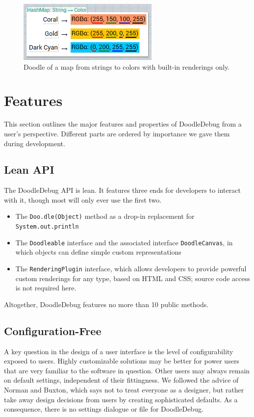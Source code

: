 \documentclass[english]{scrartcl}
\newcommand{\DD}{Dood\-le\-De\-bug\xspace}
\newcommand{\println}{\texttt{Sys\-tem.\-out.\-println}\xspace}
\begin{document}
\begin{figure}[h]
	\centering
	\includegraphics[width=0.5\linewidth]{img/Plugin_Map-Color.png}
	\caption{Doodle of a map from strings to colors with built-in renderings only.}
\end{figure}

\section{Features}
This section outlines the major features and properties of DoodleDebug from a user's perspective.
Different parts are ordered by importance we gave them during development.

\subsection{Lean API}
The \DD API is lean.
It features three ends for developers to interact with it, though most will only ever use the first two.
\begin{itemize}
\item The \texttt{Doo.dle(Object)} method as a drop-in replacement for \println
\item The \texttt{Doodleable} interface and the associated interface \texttt{DoodleCanvas}, in which objects can define simple custom representations
\item The \texttt{RenderingPlugin} interface, which allows developers to provide powerful custom renderings for any type, based on HTML and CSS; source code access is not required here.
\end{itemize}
Altogether, \DD features no more than 10 public methods.

\subsection{Configuration-Free}
A key question in the design of a user interface is the level of configurability exposed to users.
Highly customizable solutions may be better for power users that are very familiar to the software in question.
Other users may always remain on default settings, independent of their fittingness.
We followed the advice of Norman\cite[p. 199-200]{Norm88a} and Buxton\cite[p. 102]{Buxt07a}, which says not to treat everyone as a designer, but rather take away design decisions from users by creating sophisticated defaults.
As a consequence, there is no settings dialogue or file for \DD.
\end{document}
